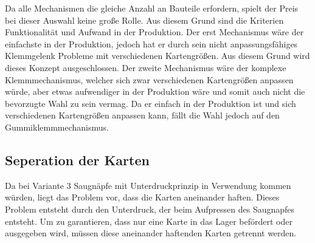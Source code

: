 Da alle Mechanismen die gleiche Anzahl an Bauteile erfordern, spielt der Preis bei dieser Auswahl keine große Rolle.
Aus diesem Grund sind die Kriterien Funktionalität und Aufwand in der Produktion.
Der erst Mechanismus wäre der einfachste in der Produktion, jedoch hat er durch sein nicht anpassungsfähiges Klemmgelenk Probleme mit verschiedenen Kartengrößen.
Aus diesem Grund wird dieses Konzept ausgeschlossen.
Der zweite Mechanismus wäre der komplexe Klemmmechanismus, welcher sich zwar verschiedenen Kartengrößen anpassen würde, aber etwas aufwendiger in der
Produktion wäre und somit auch nicht die bevorzugte Wahl zu sein vermag.
Da er einfach in der Produktion ist und sich verschiedenen Kartengrößen anpassen kann, fällt die Wahl jedoch auf den Gummiklemmmechanismus.

\subsection{Seperation der Karten}
Da bei Variante 3 Saugnäpfe mit Unterdruckprinzip in Verwendung kommen würden, liegt das Problem vor,
dass die Karten aneinander haften. Dieses Problem entsteht durch den Unterdruck, der beim Aufpressen des Saugnapfes entsteht.
Um zu garantieren, dass nur eine Karte in das Lager befördert oder ausgegeben wird, müssen diese aneinander haftenden Karten getrennt werden.

